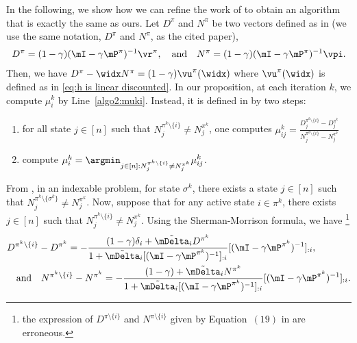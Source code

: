 In the following, we show how we can refine the work of \cite{akbarzadeh2020conditions} to obtain an algorithm that is exactly the same as ours.
Let $D^{\pi}$ and $N^{\pi}$ be two vectors defined as in \cite{akbarzadeh2020conditions} (we use the same notation,  $D^{\pi}$ and $N^{\pi}$, as the cited paper),
\begin{align*}
    D^{\pi} =(1-\gamma)(\mI-\gamma \mP^\pi)^{-1}\vr^{\pi}, \quad\text{and}\quad
    N^{\pi} =(1-\gamma)(\mI-\gamma \mP^\pi)^{-1}\vpi.
\end{align*}
Then, we have $D^{\pi} -\widx N^{\pi}=(1-\gamma)\vu^{\pi}(\widx)$ where $\vu^{\pi}(\widx)$ is defined as in \eqref{eq:h is linear discounted}. In our proposition, at each iteration $k$, we compute $\mu_i^k$ by Line~\ref{algo2:muki}. Instead, it is defined in \cite{akbarzadeh2020conditions} by two steps:
\begin{enumerate}
\item for all state $j\in[n]$ such that $N_j^{\pi^k\setminus\{i\}}{\neq} N_j^{\pi^k}$, one computes  $\mu^k_{ij}{=}\displaystyle\frac{D_j^{\pi^k\setminus\{i\}} -D_j^{\pi^k}}{ N_j^{\pi^k\setminus\{i\}} -N_j^{\pi^k}}$ 
\item \label{it:mu^k_i*} compute $\mu^k_i=\displaystyle\argmin_{j\in[n]:N_j^{\pi^k\setminus\{i\}}\neq N_j^{\pi^k}} \mu^k_{ij}$.
\end{enumerate}
From \cite[Theorem 2]{akbarzadeh2020conditions}, in an indexable problem, for state $\sigma^k$, there exists a state $j\in[n]$ such that $N_j^{\pi^k\setminus\{\sigma^k\}}\neq N_j^{\pi^k}$. Now, suppose that for any active state $i\in\pi^k$, there exists $j\in[n]$ such that $N_j^{\pi^k\setminus\{i\}}\neq N_j^{\pi^k}$. Using the Sherman-Morrison formula, we have \footnote{the expression of $D^{\pi\setminus\{i\}}$ and $N^{\pi\setminus\{i\}}$ given by Equation~$(19)$ in \cite{akbarzadeh2020conditions} are erroneous.}
\begin{align*}
    &D^{\pi^k\setminus\{i\}} -D^{\pi^k} = -\frac{(1-\gamma)\delta_i +\tilde{\mDelta}_iD^{\pi^k}}{1+\tilde{\mDelta}_i[(\mI-\gamma \mP^{\pi^k})^{-1}]_{: i}}[(\mI-\gamma \mP^{\pi^k})^{-1}]_{: i}, \\
    &\quad \text{and}\quad N^{\pi^k\setminus\{i\}} -N^{\pi^k} = -\frac{(1-\gamma) +\tilde{\mDelta}_iN^{\pi^k}}{1+\tilde{\mDelta}_i[(\mI-\gamma \mP^{\pi^k})^{-1}]_{: i}}[(\mI-\gamma \mP^{\pi^k})^{-1}]_{: i}.
\end{align*}
